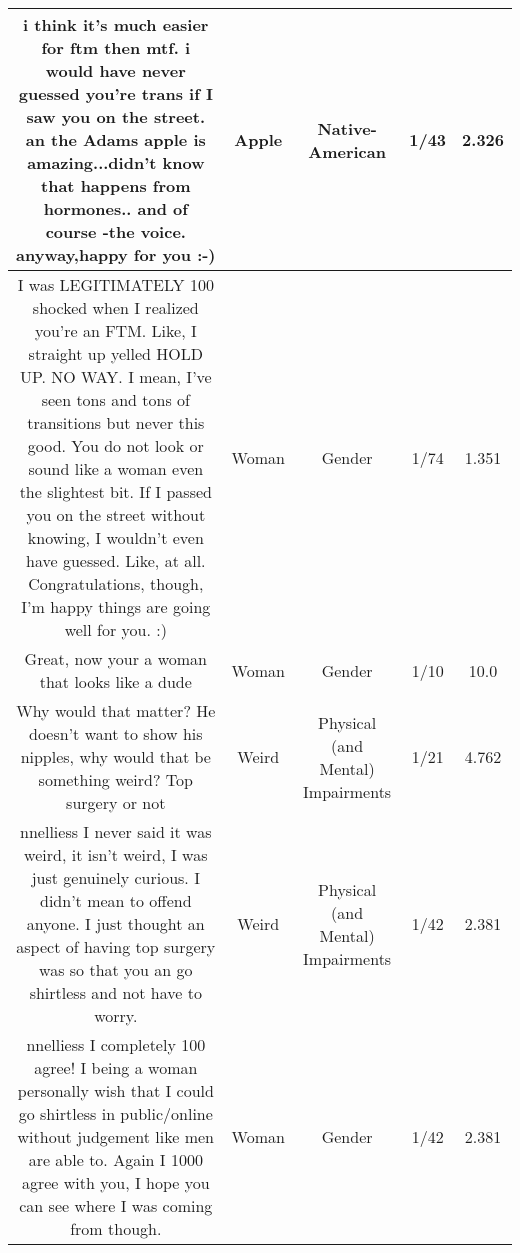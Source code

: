 \documentclass[11pt]{article}
\newlength\mylength
\begin{document}
\begin{center}
\begin{longtable}{|C{.40\mylength}|C{.30\mylength}|C{.15\mylength}|C{.15\mylength}|C{.15\mylength}|}
  i think it's much easier for ftm then mtf. i would have never guessed you're trans if I saw you on the street. an the Adams apple is amazing...didn't know that happens from hormones.. and of course -the voice. anyway,happy for you :-)  & Apple & Native-American & 1/43 & 2.326 \\  \hline
  I was LEGITIMATELY 100  shocked when I realized you're an FTM. Like, I straight up yelled  HOLD UP. NO WAY.  I mean, I've seen tons and tons of transitions but never this good. You do not look or sound like a woman even the slightest bit. If I passed you on the street without knowing, I wouldn't even have guessed. Like, at all. Congratulations, though, I'm happy things are going well for you. :)  & Woman & Gender & 1/74 & 1.351 \\  \hline
  Great, now your a woman that looks like a dude  & Woman & Gender & 1/10 & 10.0 \\  \hline
  Why would that matter? He doesn't want to show his nipples, why would that be something weird? Top surgery or not  & Weird & Physical (and Mental) Impairments & 1/21 & 4.762 \\  \hline
   nnelliess I never said it was weird, it isn't weird, I was just genuinely curious. I didn't mean to offend anyone. I just thought an aspect of having top surgery was so that you an go shirtless and not have to worry.  & Weird & Physical (and Mental) Impairments & 1/42 & 2.381 \\  \hline
   nnelliess I completely 100  agree! I being a woman personally wish that I could go shirtless in public/online without judgement like men are able to. Again I 1000  agree with you, I hope you can see where I was coming from though.  & Woman & Gender & 1/42 & 2.381 \\  \hline

\end{longtable}
\end{center}
\end{document}
